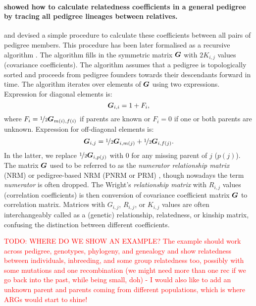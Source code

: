 \paragraph{\cite{wright1922coefficients} showed how to calculate
relatedness coefficients in a general pedigree by tracing all pedigree
lineages between relatives.}
%
\cite{emik1949systematic} and \cite{cruden1949computation} devised a
simple procedure to calculate these coefficients between all pairs of
pedigree members.
%
This procedure has been later formalised as a recursive algorithm
\citep{henderson1976simple}.
%
The algorithm fills in the symmetric matrix
$\boldsymbol{G}$ with $2K_{i,j}$ values (covariance coefficients).
%
The algorithm assumes that a pedigree is topologically sorted
and proceeds from pedigree founders towards their descendants forward in
time.
%
The algorithm iterates over elements of $\boldsymbol{G}$ using two
expressions.
%
Expression for diagonal elements is:
%
\begin{equation} \label{eqn:G_ind}
  \boldsymbol{G}_{i,i} = 1 + F_i,
\end{equation}
%
where
$F_i = \nicefrac{1}{2}\boldsymbol{G}_{m(i),f(i)}$ if parents are known
or $F_i = 0$ if one or both parents are unknown.
%
Expression for off-diagonal elements is:
%
\begin{equation} \label{eqn:G_pair}
  \boldsymbol{G}_{i,j} = \nicefrac{1}{2}\boldsymbol{G}_{i,m(j)} +
                    \nicefrac{1}{2}\boldsymbol{G}_{i,f(j)}.
\end{equation}
%
In the latter, we replace $\nicefrac{1}{2}\boldsymbol{G}_{i,p(j)}$ with $0$
for any missing parent of $j$ ($p(j)$).
%
The matrix $\boldsymbol{G}$ used to be referred to as the
\textit{numerator relationship matrix} (NRM) or
pedigree-based NRM (PNRM or PRM) \citep{henderson1976simple},
though nowadays the term \textit{numerator} is often dropped.
%
The Wright's \textit{relationship matrix} with $R_{i,j}$ values
(correlation coefficients) is then conversion of covariance coefficient
matrix $\boldsymbol{G}$ to correlation matrix.
%
Matrices with $G_{i,j}$, $R_{i,j}$, or $K_{i,j}$ values are
often interchangeably called as a (genetic) relationship, relatedness,
or kinship matrix, confusing the distinction between different
coefficients.

\textcolor{red}{TODO: WHERE DO WE SHOW AN EXAMPLE? The example should work
across pedigree, genotypes, phylogeny, and genealogy and show relatedness
between individuals, inbreeding, and some group relatedness too, possibly
with some mutations and one recombination (we might need more than one rec
if we go back into the past, while being small, doh) - I would also like
to add an unknown parent and parents coming from different populations,
which is where ARGs would start to shine!}


